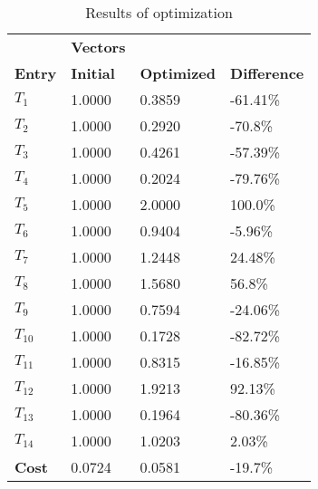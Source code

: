 \begin{table}[H]
\centering
\begin{tabular}{llll}
\textbf{}      & \cellcolor[HTML]{EFEFEF}\textbf{Vectors} & \textbf{} & \textbf{}         \\
\rowcolor[HTML]{EFEFEF} 
\textbf{Entry} & \textbf{Initial} & \textbf{Optimized} & \textbf{Difference} \\
$T_1$ & 1.0000 & 0.3859 & -61.41\% \\ 
$T_2$ & 1.0000 & 0.2920 & -70.8\% \\ 
$T_3$ & 1.0000 & 0.4261 & -57.39\% \\ 
$T_4$ & 1.0000 & 0.2024 & -79.76\% \\ 
$T_5$ & 1.0000 & 2.0000 & 100.0\% \\ 
$T_6$ & 1.0000 & 0.9404 & -5.96\% \\ 
$T_7$ & 1.0000 & 1.2448 & 24.48\% \\ 
$T_8$ & 1.0000 & 1.5680 & 56.8\% \\ 
$T_9$ & 1.0000 & 0.7594 & -24.06\% \\ 
$T_10$ & 1.0000 & 0.1728 & -82.72\% \\ 
$T_11$ & 1.0000 & 0.8315 & -16.85\% \\ 
$T_12$ & 1.0000 & 1.9213 & 92.13\% \\ 
$T_13$ & 1.0000 & 0.1964 & -80.36\% \\ 
$T_14$ & 1.0000 & 1.0203 & 2.03\% \\ 
\rowcolor[HTML]{EFEFEF} 
\textbf{Cost}  & 0.0724 & 0.0581 & -19.7\% \\ 
\end{tabular}
\caption{Results of optimization}
\label{tab:OptimizationAnalysis}
\end{table}